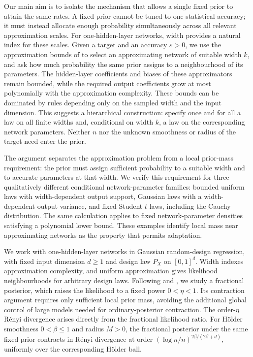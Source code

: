 \documentclass[11pt,a4paper]{article}
\theoremstyle{remark}
\begin{document}
Our main aim is to isolate the mechanism that allows a single fixed
prior to attain the same rates. A fixed prior cannot be tuned to one
statistical accuracy; it must instead allocate enough probability
simultaneously across all relevant approximation scales. For
one-hidden-layer networks, width provides a natural index for these
scales. Given a target and an accuracy $\varepsilon>0$, we use the
approximation bounds of \citet{yangzhou2024,yangzhou2025} to select an approximating
network of suitable width $k$, and ask how much probability the same
prior assigns to a neighbourhood of its parameters. The hidden-layer coefficients
and biases of these approximators remain bounded, while the required
output coefficients grow at most polynomially with the approximation
complexity. These bounds can be dominated by rules depending only on
the sampled width and the input dimension. This suggests a hierarchical
construction: specify once and for all a law on all finite widths and,
conditional on width $k$, a law on the corresponding network parameters. Neither
$n$ nor the unknown smoothness or radius of the target need enter the
prior.

The argument separates the approximation problem from a local
prior-mass requirement: the prior must assign sufficient probability
to a suitable width and to accurate parameters at that width.
We verify this requirement for three
qualitatively different conditional network-parameter families: bounded uniform
laws with width-dependent output support, Gaussian laws with a
width-dependent output variance, and fixed Student $t$ laws, including
the Cauchy distribution. The same calculation applies to fixed network-parameter
densities satisfying a polynomial lower bound. These examples identify
local mass near approximating networks as the property that permits
adaptation.

We work with one-hidden-layer networks in Gaussian random-design
regression, with fixed input dimension $d\geq1$ and design law $P_X$
on $[0,1]^d$. Width indexes approximation complexity, and uniform
approximation gives likelihood neighbourhoods for arbitrary design laws.
Following \citet{bhattacharya2019} and \citet{castilloegels2025},
we study a fractional posterior, which raises the likelihood to a fixed
power $0<\eta<1$. Its contraction argument requires only sufficient
local prior mass, avoiding the additional global control of large models
needed for ordinary-posterior contraction. The order-$\eta$ R\'enyi
divergence arises directly from the fractional likelihood ratio.
For H\"older smoothness $0<\beta\leq1$ and radius $M>0$, the
fractional posterior under the same fixed prior contracts in R\'enyi
divergence at order $(\log n/n)^{2\beta/(2\beta+d)}$, uniformly over
the corresponding H\"older ball.
\end{document}
